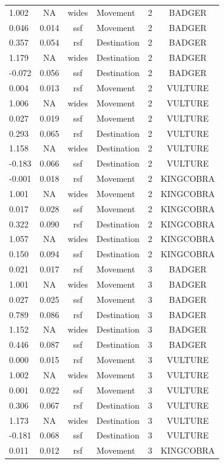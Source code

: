 \documentclass[10pt,a4paper]{article}
\begin{document}
\begin{table}
{\begin{tabular}[t]{lcclcc}
1.002 & NA & wides & Movement & 2 & BADGER\\
0.046 & 0.014 & ssf & Movement & 2 & BADGER\\
0.357 & 0.054 & rsf & Destination & 2 & BADGER\\
1.179 & NA & wides & Destination & 2 & BADGER\\
-0.072 & 0.056 & ssf & Destination & 2 & BADGER\\
0.004 & 0.013 & rsf & Movement & 2 & VULTURE\\
1.006 & NA & wides & Movement & 2 & VULTURE\\
0.027 & 0.019 & ssf & Movement & 2 & VULTURE\\
0.293 & 0.065 & rsf & Destination & 2 & VULTURE\\
1.158 & NA & wides & Destination & 2 & VULTURE\\
-0.183 & 0.066 & ssf & Destination & 2 & VULTURE\\
-0.001 & 0.018 & rsf & Movement & 2 & KINGCOBRA\\
1.001 & NA & wides & Movement & 2 & KINGCOBRA\\
0.017 & 0.028 & ssf & Movement & 2 & KINGCOBRA\\
0.322 & 0.090 & rsf & Destination & 2 & KINGCOBRA\\
1.057 & NA & wides & Destination & 2 & KINGCOBRA\\
0.150 & 0.094 & ssf & Destination & 2 & KINGCOBRA\\
0.021 & 0.017 & rsf & Movement & 3 & BADGER\\
1.001 & NA & wides & Movement & 3 & BADGER\\
0.027 & 0.025 & ssf & Movement & 3 & BADGER\\
0.789 & 0.086 & rsf & Destination & 3 & BADGER\\
1.152 & NA & wides & Destination & 3 & BADGER\\
0.446 & 0.087 & ssf & Destination & 3 & BADGER\\
0.000 & 0.015 & rsf & Movement & 3 & VULTURE\\
1.002 & NA & wides & Movement & 3 & VULTURE\\
0.001 & 0.022 & ssf & Movement & 3 & VULTURE\\
0.306 & 0.067 & rsf & Destination & 3 & VULTURE\\
1.173 & NA & wides & Destination & 3 & VULTURE\\
-0.181 & 0.068 & ssf & Destination & 3 & VULTURE\\
0.011 & 0.012 & rsf & Movement & 3 & KINGCOBRA\\

\end{tabular}}
\end{table}
\end{document}
